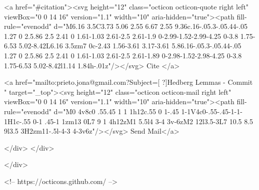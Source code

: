      <a  href="#citation"><svg height="12" class="octicon octicon-quote right left" viewBox="0 0 14 16" version="1.1" width="10" aria-hidden="true"><path fill-rule="evenodd" d="M6.16 3.5C3.73 5.06 2.55 6.67 2.55 9.36c.16-.05.3-.05.44-.05 1.27 0 2.5.86 2.5 2.41 0 1.61-1.03 2.61-2.5 2.61-1.9 0-2.99-1.52-2.99-4.25 0-3.8 1.75-6.53 5.02-8.42L6.16 3.5zm7 0c-2.43 1.56-3.61 3.17-3.61 5.86.16-.05.3-.05.44-.05 1.27 0 2.5.86 2.5 2.41 0 1.61-1.03 2.61-2.5 2.61-1.89 0-2.98-1.52-2.98-4.25 0-3.8 1.75-6.53 5.02-8.42l1.14 1.84h-.01z"/></svg> Cite
      </a>

      <a href="mailto:prieto.jona@gmail.com?Subject=[ ?]Hedberg Lemmas - Commit " target="_top"><svg height="12" class="octicon octicon-mail right left" viewBox="0 0 14 16" version="1.1" width="10" aria-hidden="true"><path fill-rule="evenodd" d="M0 4v8c0 .55.45 1 1 1h12c.55 0 1-.45 1-1V4c0-.55-.45-1-1-1H1c-.55 0-1 .45-1 1zm13 0L7 9 1 4h12zM1 5.5l4 3-4 3v-6zM2 12l3.5-3L7 10.5 8.5 9l3.5 3H2zm11-.5l-4-3 4-3v6z"/></svg> Send Mail</a>

    </div>
  </div>

</div>

<!-- https://octicons.github.com/ -->





